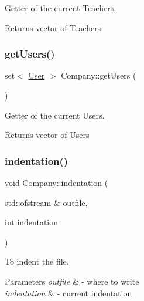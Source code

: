 Getter of the current Teachers. 

\begin{DoxyReturn}{Returns}
vector of Teachers 
\end{DoxyReturn}
\mbox{\label{class_company_a06704156dc1962518149b2307e448691}} 
\subsubsection{\texorpdfstring{get\+Users()}{getUsers()}}
{\footnotesize\ttfamily set$<$ \mbox{\hyperlink{class_user}{User}} $>$ Company\+::get\+Users (\begin{DoxyParamCaption}{ }\end{DoxyParamCaption})}



Getter of the current Users. 

\begin{DoxyReturn}{Returns}
vector of Users 
\end{DoxyReturn}
\mbox{\label{class_company_aa8b5bbb3b2d49d13f36d4fcdfc0d20d1}} 
\subsubsection{\texorpdfstring{indentation()}{indentation()}}
{\footnotesize\ttfamily void Company\+::indentation (\begin{DoxyParamCaption}\item[{std\+::ofstream \&}]{outfile,  }\item[{int}]{indentation }\end{DoxyParamCaption})}



To indent the file. 


\begin{DoxyParams}{Parameters}
{\em outfile} & -\/ where to write \\
\hline
{\em indentation} & -\/ current indentation \\
\hline
\end{DoxyParams}
\mbox{\label{class_company_a12366416c26ae1d5046695261374f440}} 
